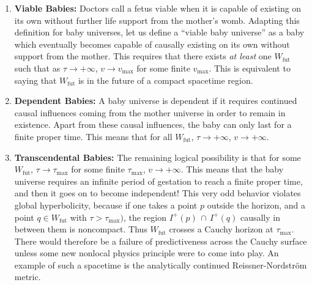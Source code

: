 \documentclass{article}
\begin{document}
\begin{enumerate}
\item \textbf{Viable Babies:} Doctors call a fetus viable when it is capable of existing on its own without further life support from the mother's womb.  Adapting this definition for baby universes, let us define a ``viable baby universe'' as a baby which eventually becomes capable of causally existing on its own without support from the mother.  This requires that there exists \emph{at least} one $W_\mathrm{fut}$ such that as $\tau \to +\infty$, $v \to v_\mathrm{max}$ for some finite $v_\mathrm{max}$.  This is equivalent to saying that $W_\mathrm{fut}$ is in the future of a compact spacetime region.

\item \textbf{Dependent Babies:} A baby universe is dependent if it requires continued causal influences coming from the mother universe in order to remain in existence.  Apart from these causal influences, the baby can only last for a finite proper time.  This means that for all $W_\mathrm{fut}$, $\tau \to +\infty$, $v \to +\infty$.

\item \textbf{Transcendental Babies:} The remaining logical possibility is that for some $W_\mathrm{fut}$, $\tau \to \tau_\mathrm{max}$ for some finite $\tau_\mathrm{max}$, $v \to +\infty$.  This means that the baby universe requires an infinite period of gestation to reach a finite proper time, and then it goes on to become independent!  This very odd behavior violates global hyperbolicity, because if one takes a point $p$ outside the horizon, and a point $q \in W_\mathrm{fut}$ with $\tau > \tau_\mathrm{max})$, the region $I^+(p)\,\cap\,I^+(q)$ causally in between them is noncompact.  Thus $W_\mathrm{fut}$ crosses a Cauchy horizon at $\tau_\mathrm{max}$.  There would therefore be a failure of predictiveness across the Cauchy surface unless some new nonlocal physics principle were to come into play.  An example of such a spacetime is the analytically continued Reissner-Nordstr\"{o}m metric.
\end{enumerate}
\end{document}

